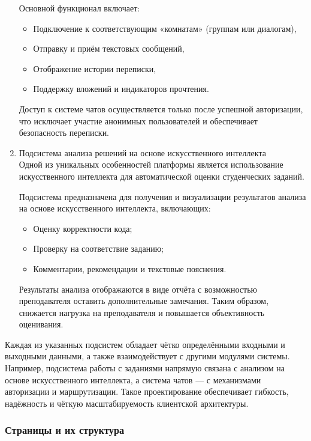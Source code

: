 \begin{enumerate}
  Основной функционал включает:
  \begin{itemize}
    \item Подключение к соответствующим «комнатам» (группам или диалогам),
    \item Отправку и приём текстовых сообщений,
    \item Отображение истории переписки,
    \item Поддержку вложений и индикаторов прочтения.
  \end{itemize}
  
  Доступ к системе чатов осуществляется только после успешной авторизации, что исключает участие анонимных пользователей и обеспечивает безопасность переписки.

  \item Подсистема анализа решений на основе искусственного интеллекта\\
  Одной из уникальных особенностей платформы является использование искусственного интеллекта для автоматической оценки студенческих заданий.
  
  Подсистема предназначена для получения и визуализации результатов анализа на основе искусственного интеллекта, включающих:
  \begin{itemize}
    \item Оценку корректности кода;
    \item Проверку на соответствие заданию;
    \item Комментарии, рекомендации и текстовые пояснения.
  \end{itemize}
  
  Результаты анализа отображаются в виде отчёта с возможностью преподавателя оставить дополнительные замечания. Таким образом, снижается нагрузка на преподавателя и повышается объективность оценивания.

\end{enumerate}

Каждая из указанных подсистем обладает чётко определёнными входными и выходными данными, а также взаимодействует с другими модулями системы. Например, подсистема работы с заданиями напрямую связана с анализом на основе искусственного интеллекта, а система чатов — с механизмами авторизации и маршрутизации. Такое проектирование обеспечивает гибкость, надёжность и чёткую масштабируемость клиентской архитектуры.

\subsubsection{Страницы и их структура}

